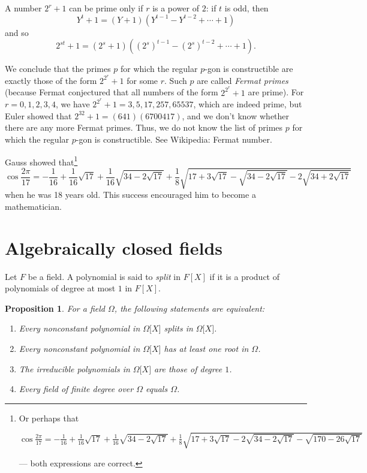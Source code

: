 \documentclass[a4paper,11pt,final,openany]{memoir}
\newtheorem{proposition}[X]{Proposition}
\theoremstyle{nonumberplain}
\begin{document}
A number $2^{r}+1$ can be prime only if $r$ is a power of $2$: if $t$ is odd,
then
\[
Y^{t}+1=(Y+1)(Y^{t-1}-Y^{t-2}+\cdots+1)
\]
and so%
\[
2^{st}+1=(2^{s}+1)((2^{s})^{t-1}-(2^{s})^{t-2}+\cdots+1)\text{.}%
\]


We conclude that the primes $p$ for which the regular $p$-gon is constructible
are exactly those of the form $2^{2^{r}}+1$ for some $r$. Such $p$ are called
\emph{Fermat primes}%
(because Fermat conjectured that all numbers of the form $2^{2^{r}}+1$ are
prime). For $r=0,1,2,3,4$, we have $2^{2^{r}}+1=3,5,17,257,65537$, which are
indeed prime, but Euler showed that $2^{32}+1=(641)(6700417)$, and we don't
know whether there are any more Fermat primes. Thus, we do not know the list
of primes $p$ for which the regular $p$-gon is constructible. See Wikipedia:
Fermat number.

Gauss showed that\footnote{Or perhaps that
\par
$\cos\frac{2\pi}{17}=-\frac{1}{16}+\frac{1}{16}\sqrt{17}+\frac{1}{16}%
\sqrt{34-2\sqrt{17}}+\frac{1}{8}\sqrt{17+3\sqrt{17}-2\sqrt{34-2\sqrt{17}%
}-\sqrt{170-26\sqrt{17}}}$
\par
--- both expressions are correct.}
\[
\cos\frac{2\pi}{17}=-\frac{1}{16}+\frac{1}{16}\sqrt{17}+\frac{1}{16}%
\sqrt{34-2\sqrt{17}}+\frac{1}{8}\sqrt{17+3\sqrt{17}-\sqrt{34-2\sqrt{17}%
}-2\sqrt{34+2\sqrt{17}}}%
\]
when he was 18 years old. This success encouraged him to become a mathematician.

\section{Algebraically closed fields}

Let $F$ be a field. A polynomial is said to
%
\emph{split} in $F[X]$ if it is a product of polynomials of degree at most $1$
in $F[X]$.

\begin{proposition}
\label{ac1}For a field $\Omega$, the following statements are equivalent:

\begin{enumerate}
\item Every nonconstant polynomial in $\Omega\lbrack X]$ splits in
$\Omega\lbrack X]$.

\item Every nonconstant polynomial in $\Omega\lbrack X]$ has at least one root
in $\Omega$.

\item The irreducible polynomials in $\Omega\lbrack X]$ are those of degree
$1$.

\item Every field of finite degree over $\Omega$ equals $\Omega$.
\end{enumerate}
\end{proposition}
\end{document}
